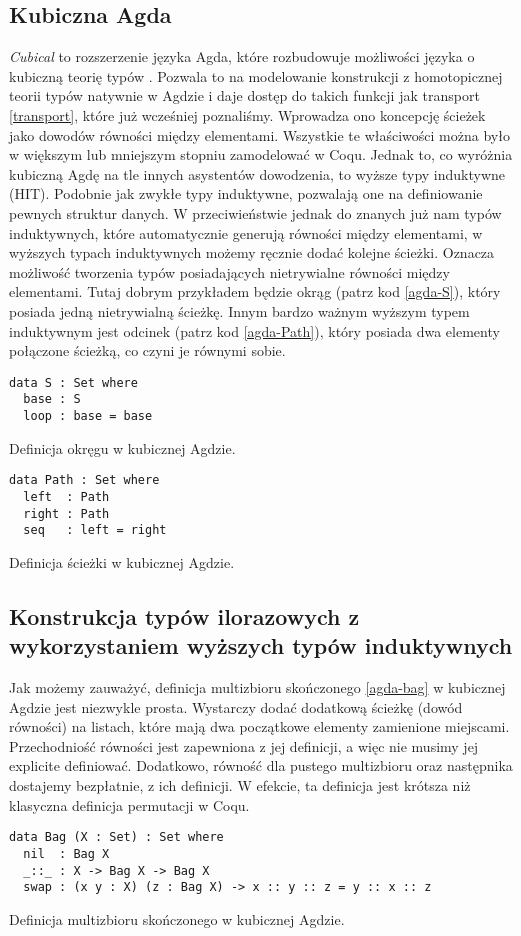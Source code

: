 \subsection{Kubiczna Agda}
\emph{Cubical} to rozszerzenie języka Agda, które rozbudowuje możliwości języka o kubiczną teorię typów \cite{cubical}. Pozwala to na modelowanie konstrukcji z homotopicznej teorii typów natywnie w Agdzie i daje dostęp do takich funkcji jak transport \ref{transport}, które już wcześniej poznaliśmy. Wprowadza ono koncepcję ścieżek jako dowodów równości między elementami. Wszystkie te właściwości można było w większym lub mniejszym stopniu zamodelować w Coqu. Jednak to, co wyróżnia kubiczną Agdę na tle innych asystentów dowodzenia, to wyższe typy induktywne (HIT). Podobnie jak zwykłe typy induktywne, pozwalają one na definiowanie pewnych struktur danych. W przeciwieństwie jednak do znanych już nam typów induktywnych, które automatycznie generują równości między elementami, w wyższych typach induktywnych możemy ręcznie dodać kolejne ścieżki. Oznacza możliwość tworzenia typów posiadających nietrywialne równości między elementami. Tutaj dobrym przykładem będzie okrąg (patrz kod \ref{agda-S}), który posiada jedną nietrywialną ścieżkę. Innym bardzo ważnym wyższym typem induktywnym jest odcinek (patrz kod \ref{agda-Path}), który posiada dwa elementy połączone ścieżką, co czyni je równymi sobie.
\begin{code}
\begin{verbatim}
data S : Set where
  base : S
  loop : base = base
\end{verbatim}
\caption{Definicja okręgu w kubicznej Agdzie.}
\label{agda-S}
\end{code}

\begin{code}
\begin{verbatim}
data Path : Set where
  left  : Path
  right : Path
  seq   : left = right
\end{verbatim}
\caption{Definicja ścieżki w kubicznej Agdzie.}
\label{agda-Path}
\end{code}
\subsection{Konstrukcja typów ilorazowych z wykorzystaniem wyższych typów induktywnych}
Jak możemy zauważyć, definicja multizbioru skończonego \ref{agda-bag} w kubicznej Agdzie jest niezwykle prosta. Wystarczy dodać dodatkową ścieżkę (dowód równości) na listach, które mają dwa początkowe elementy zamienione miejscami. Przechodniość równości jest zapewniona z jej definicji, a więc nie musimy jej explicite definiować. Dodatkowo, równość dla pustego multizbioru oraz następnika dostajemy bezpłatnie, z ich definicji. W efekcie, ta definicja jest krótsza niż klasyczna definicja permutacji w Coqu.
\begin{code}
\begin{verbatim}
data Bag (X : Set) : Set where
  nil  : Bag X
  _::_ : X -> Bag X -> Bag X
  swap : (x y : X) (z : Bag X) -> x :: y :: z = y :: x :: z
\end{verbatim}
\caption{Definicja multizbioru skończonego w kubicznej Agdzie.}
\label{agda-bag}
\end{code}

